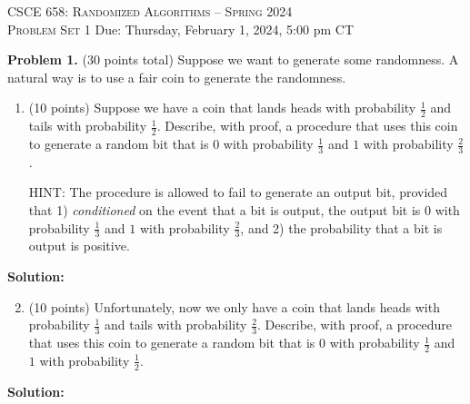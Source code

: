 \documentclass[11pt]{article}
\begin{document}
\begin{center}
{\Large\textsc{CSCE 658: Randomized Algorithms -- Spring 2024 \\ 
Problem Set 1}}
\vskip 0.1in
Due: Thursday, February 1, 2024, 5:00 pm CT
\end{center}


\noindent
\textbf{Problem 1.} (30 points total)
Suppose we want to generate some randomness. 
A natural way is to use a fair coin to generate the randomness. 
\begin{enumerate}
\item (10 points)
Suppose we have a coin that lands heads with probability $\frac{1}{2}$ and tails with probability $\frac{1}{2}$. 
Describe, with proof, a procedure that uses this coin to generate a random bit that is $0$ with probability $\frac{1}{3}$ and $1$ with probability $\frac{2}{3}$.

\noindent
HINT: The procedure is allowed to fail to generate an output bit, provided that 1) \emph{conditioned} on the event that a bit is output, the output bit is $0$ with probability $\frac{1}{3}$ and $1$ with probability $\frac{2}{3}$, and 2) the probability that a bit is output is positive.  
\end{enumerate}

\noindent\textbf{Solution:}













\begin{enumerate}
\setcounter{enumi}{1}
\item (10 points)
Unfortunately, now we only have a coin that lands heads with probability $\frac{1}{3}$ and tails with probability $\frac{2}{3}$. 
Describe, with proof, a procedure that uses this coin to generate a random bit that is $0$ with probability $\frac{1}{2}$ and $1$ with probability $\frac{1}{2}$.
\end{enumerate}

\noindent\textbf{Solution:}
\end{document}
